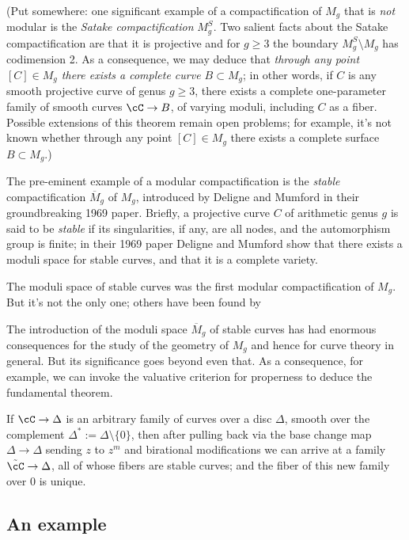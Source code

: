 (Put somewhere: one significant example of a compactification of $M_g$ that is \emph{not} modular is the \emph{Satake compactification} $M_g^S$. Two salient facts about the Satake compactification are that it is projective and for $g \geq 3$ the boundary $M_g^S \setminus M_g$ has codimension 2. As a consequence, we may deduce that \emph{through any point $[C] \in M_g$ there exists a complete curve $B \subset M_g$}; in other words,
 if $C$ is any smooth projective curve of genus $g \geq 3$, there exists a complete one-parameter family of smooth curves $\cC \to B$, of varying moduli, including $C$ as a fiber. Possible extensions of this theorem remain open problems; for example, it's not known whether  through any point $[C] \in M_g$ there exists a complete surface $B \subset M_g$.)
 
 The pre-eminent example of a modular compactification is the \emph{stable} compactification $\overline M_g$ of $M_g$, introduced by Deligne and Mumford in their groundbreaking 1969 paper. Briefly, a projective curve $C$ of arithmetic genus $g$ is said to be \emph{stable} if its singularities, if any, are all nodes, and the automorphism group is finite; in their 1969 paper Deligne and Mumford show that there exists a moduli space for stable curves, and that it is a complete variety.
 
 The moduli space of stable curves was the first modular compactification of $M_g$. But it's not the only one; others have been found by



The introduction of the moduli space $\overline M_g$ of stable curves has had enormous consequences for the study of the geometry of $M_g$ and hence for curve theory in general. But its significance goes beyond even that. As a consequence, for example, we can invoke the valuative criterion for properness to deduce the fundamental theorem.

\begin{theorem}
If $\cC \to \Delta$ is an arbitrary family of curves over a disc $\Delta$, smooth over the complement $\Delta^* := \Delta \setminus \{0\}$, then after pulling back via the base change map $\Delta \to \Delta$ sending $z$ to $z^m$ and birational modifications we can arrive at a family $\tilde \cC \to \Delta$, all of whose fibers are stable curves; and the fiber of this new family over $0$ is unique.
\end{theorem}

\subsection{An example}

